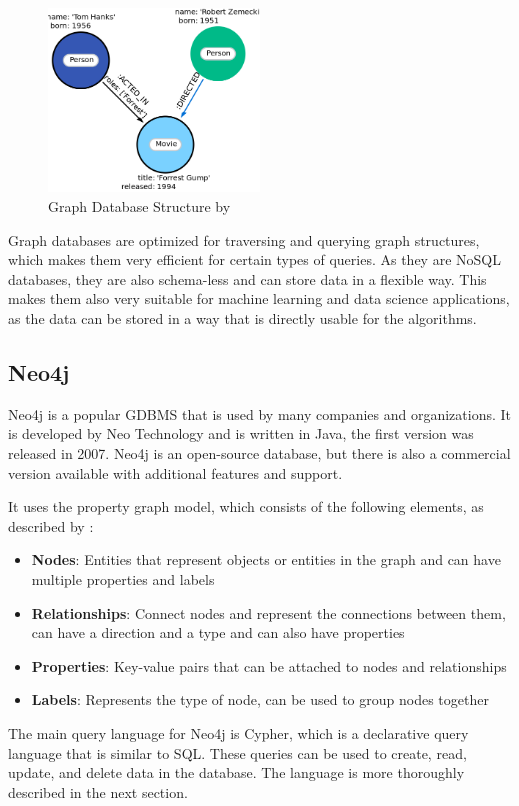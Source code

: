 \documentclass[english,smartquotes,apa]{hgbreport}
\begin{document}
\begin{figure}[h]
	\centering
	\includegraphics[width=0.5\textwidth]{graphdb.png}
	\caption{Graph Database Structure by \cite{neo4j}}
	\label{fig:graph}
\end{figure}

Graph databases are optimized for traversing and querying graph structures, which makes them very efficient for certain types of queries. As they are NoSQL databases, they are also schema-less and can store data in a flexible way. This makes them also very suitable for machine learning and data science applications, as the data can be stored in a way that is directly usable for the algorithms.

\subsection*{Neo4j}

Neo4j is a popular GDBMS that is used by many companies and organizations. It is developed by Neo Technology and is written in Java, the first version was released in 2007. Neo4j is an open-source database, but there is also a commercial version available with additional features and support. \parencite{neo4j}

\pagebreak
\noindent
It uses the property graph model, which consists of the following elements, as described by \cite{lal2015neo4j}:

\begin{itemize}
	\item \textbf{Nodes}: Entities that represent objects or entities in the graph and can have multiple properties and labels
	\item \textbf{Relationships}: Connect nodes and represent the connections between them, can have a direction and a type and can also have properties
	\item \textbf{Properties}: Key-value pairs that can be attached to nodes and relationships
	\item \textbf{Labels}: Represents the type of node, can be used to group nodes together
\end{itemize}
\bigskip
\noindent
The main query language for Neo4j is Cypher, which is a declarative query language that is similar to SQL. These queries can be used to create, read, update, and delete data in the database. The language is more thoroughly described in the next section.
\end{document}
